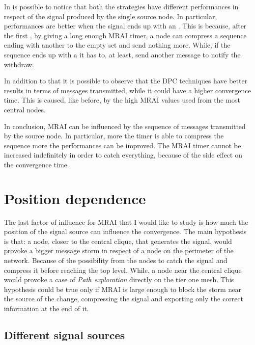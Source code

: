 In  is possible to notice that
both the strategies have different performances in respect of the signal
produced by the single source node.
In particular, performances are better when the signal ends up with an .
This is because, after the first , by giving a long enough \ac{MRAI} timer,
a node can compress a sequence ending with another  to the
empty set and send nothing more.
While, if the sequence ends up with a  it has to, at least, send another
message to notify the withdraw.

In addition to that it is possible to observe that the \ac{DPC} techniques have better
results in terms of messages transmitted, while it could have a higher
convergence time.
This is caused, like before, by the high \ac{MRAI} values used from the most
central nodes.

In conclusion, \ac{MRAI} can be influenced by the sequence of messages transmitted
by the source node.
In particular, more the timer is able to compress the sequence more the performances
can be improved.
The \ac{MRAI} timer cannot be increased indefinitely in order to catch
everything, because of the side effect on the convergence time.

\section{Position dependence}
\label{sec:position_dependance}

The last factor of influence for \ac{MRAI} that I would like to study is how much
the position of the signal source can influence the convergence.
The main hypothesis is that: a node, closer to the central clique, that generates
the signal, would provoke a bigger message storm in respect of a node on the perimeter
of the network.
Because of the possibility from the nodes to catch the signal and compress it
before reaching the top level.
While, a node near the central clique would provoke a case of \textit{Path exploration}
directly on the tier one mesh.
This hypothesis could be true only if \ac{MRAI} is large enough to block the
storm near the source of the change, compressing the signal and exporting only
the correct information at the end of it.

\subsection{Different signal sources}
\label{subsec:different_destinations}

